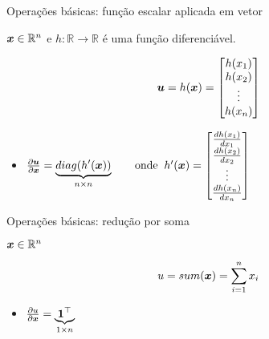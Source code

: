 \documentclass[10pt]{beamer}
\begin{document}
\begin{frame}{Operações básicas: função escalar aplicada em vetor}
\Large{


$\bm{x}\in \mathbb{R}^{n}$ e $h:\mathbb{R} \rightarrow \mathbb{R}$ é uma função diferenciável.

\vspace{0.1 cm}

\begin{equation*}
\bm{u} = h(\bm{x}) = \begin{bmatrix}h(x_1)\\ h(x_2)\\ \vdots \\h(x_n)\end{bmatrix}
\end{equation*}

\vspace{0.1 cm}
\begin{itemize}
\item $\frac{\partial \bm{u}}{\partial \bm{x}} = \underbrace{diag(h^{\prime}(\bm{x}))}_{\tiny{n \times n}} \;\;\;\;\;\;\; \text{onde} \;\; h^{\prime}(\bm{x}) = \begin{bmatrix}\frac{d h(x_1)}{d x_1}\\ \frac{d h(x_2)}{d x_2}\\ \vdots \\\frac{d h(x_n)}{d x_n}\end{bmatrix}$
\end{itemize}
}
\end{frame}


\begin{frame}{Operações básicas: redução por soma}
\Large{
$\bm{x}\in \mathbb{R}^{n}$

\vspace{0.3 cm}

\begin{equation*}
u = sum(\bm{x}) = \sum_{i=1}^{n} x_{i}
\end{equation*}

\vspace{0.3 cm}
\begin{itemize}
\item $\frac{\partial u}{\partial \bm{x}} = \underbrace{\bm{1}^{\top}}_{\tiny{1 \times n}}$
\end{itemize}
}
\end{frame}
\end{document}
